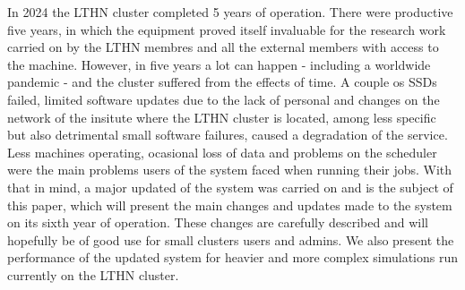 
In 2024 the LTHN cluster completed 5 years of operation. There were productive five years, in which
the equipment proved itself invaluable for the research work carried on by the LTHN membres and all
the external members with access to the machine. However, in five years a lot can happen - including
a worldwide pandemic - and the cluster suffered from the effects of time. A couple os SSDs failed,
limited software updates due to the lack of personal and changes on the network of the insitute
where the LTHN cluster is located, among less specific but also detrimental small software failures,
caused a degradation of the service. Less machines operating, ocasional loss of data and problems
on the scheduler were the main problems users of the system faced when running their jobs. With that in
mind, a major updated of the system was carried on and is the subject of this paper, which will
present the main changes and updates made to the system on its sixth year of operation. These changes
are carefully described and will hopefully be of good use for small clusters users and admins. We also
present the performance of the updated system for heavier and more complex simulations run currently
on the LTHN cluster.

